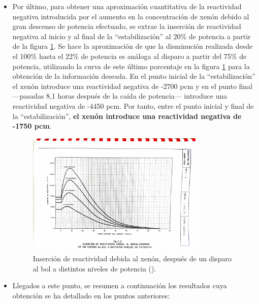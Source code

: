 \begin{itemize}
  \item Por último, para obtener una aproximación cuantitativa de la reactividad negativa introducida por el aumento en la concentración de xenón debido al gran descenso de potencia efectuado, se extrae la inserción de reactividad negativa al inicio y al final de la ``estabilización'' al 20\% de potencia a partir de la figura \ref{fig:reactividad_xenon_disparo}. Se hace la aproximación de que la disminución realizada desde el 100\% hasta el 22\% de potencia es análoga al disparo a partir del 75\% de potencia, utilizando la curva de este último porcentaje en la figura \ref{fig:reactividad_xenon_disparo} para la obtención de la información deseada. En el punto inicial de la ``estabilización'' el xenón introduce una reactividad negativa de -2700 pcm y en el punto final ---pasadas 8,1 horas después de la caída de potencia--- introduce una reactividad negativa de -4450 pcm. Por tanto, entre el punto inicial y final de la ``estabilización'', \textbf{el xenón introduce una reactividad negativa de -1750 pcm}.
  
  \begin{figure}[!h]
    \centering
    \includegraphics[width=0.8\textwidth]{content/figures/reactividad_xenon_disparo.pdf}
    \caption{Inserción de reactividad debida al xenón, después de un disparo al \acrshort{bol} a distintos niveles de potencia (\cite{documentacion_sgiz}).}
    \label{fig:reactividad_xenon_disparo}
  \end{figure}

  \item Llegados a este punto, se resumen a continuación los resultados cuya obtención se ha detallado en los puntos anteriores:
  

\end{itemize}
